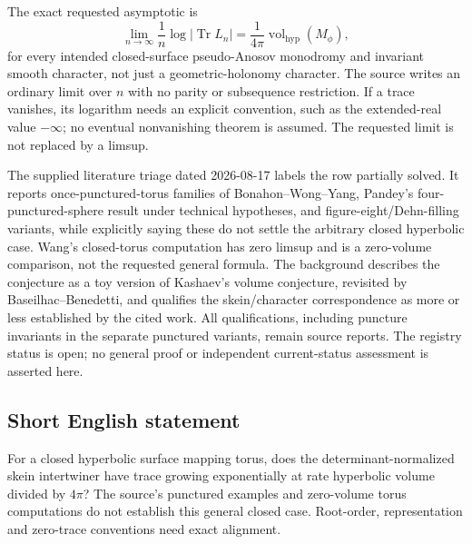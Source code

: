 \documentclass[11pt]{article}
\begin{document}
The exact requested asymptotic is
\[
\lim_{n\to\infty}\frac1n\log|\operatorname{Tr}L_n|
=\frac1{4\pi}\operatorname{vol}_{\mathrm{hyp}}(M_\phi),
\]
for every intended closed-surface pseudo-Anosov monodromy and invariant smooth character, not just a geometric-holonomy character. The source writes an ordinary limit over \(n\) with no parity or subsequence restriction. If a trace vanishes, its logarithm needs an explicit convention, such as the extended-real value \(-\infty\); no eventual nonvanishing theorem is assumed. The requested limit is not replaced by a limsup.

The supplied literature triage dated 2026-08-17 labels the row partially solved. It reports once-punctured-torus families of Bonahon--Wong--Yang, Pandey's four-punctured-sphere result under technical hypotheses, and figure-eight/Dehn-filling variants, while explicitly saying these do not settle the arbitrary closed hyperbolic case. Wang's closed-torus computation has zero limsup and is a zero-volume comparison, not the requested general formula. The background describes the conjecture as a toy version of Kashaev's volume conjecture, revisited by Baseilhac--Benedetti, and qualifies the skein/character correspondence as more or less established by the cited work. All qualifications, including puncture invariants in the separate punctured variants, remain source reports. The registry status is open; no general proof or independent current-status assessment is asserted here.
\subsection{Short English statement}
For a closed hyperbolic surface mapping torus, does the determinant-normalized skein intertwiner have trace growing exponentially at rate hyperbolic volume divided by \(4\pi\)? The source's punctured examples and zero-volume torus computations do not establish this general closed case. Root-order, representation and zero-trace conventions need exact alignment.
\end{document}
